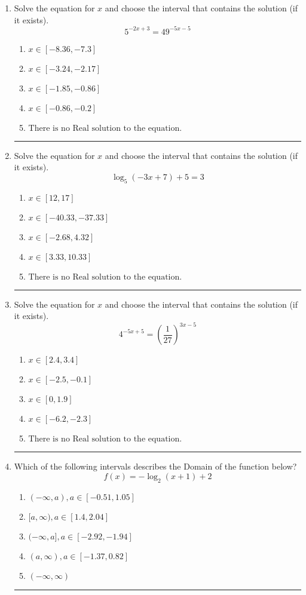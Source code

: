 \documentclass[14pt]{extbook}
\newcommand{\litem}[1]{\item#1\hspace*{-1cm}\rule{\textwidth}{0.4pt}}
\begin{document}
\begin{enumerate}
{\begin{enumerate}[label=\Alph*.]
\end{enumerate} }
\litem{
Solve the equation for $x$ and choose the interval that contains the solution (if it exists).\[ 5^{-2x+3} = 49^{-5x-5} \]\begin{enumerate}[label=\Alph*.]
\item \( x \in [-8.36, -7.3] \)
\item \( x \in [-3.24, -2.17] \)
\item \( x \in [-1.85, -0.86] \)
\item \( x \in [-0.86, -0.2] \)
\item \( \text{There is no Real solution to the equation.} \)

\end{enumerate} }
\litem{
Solve the equation for $x$ and choose the interval that contains the solution (if it exists).\[ \log_{5}{(-3x+7)}+5 = 3 \]\begin{enumerate}[label=\Alph*.]
\item \( x \in [12, 17] \)
\item \( x \in [-40.33, -37.33] \)
\item \( x \in [-2.68, 4.32] \)
\item \( x \in [3.33, 10.33] \)
\item \( \text{There is no Real solution to the equation.} \)

\end{enumerate} }
\litem{
Solve the equation for $x$ and choose the interval that contains the solution (if it exists).\[ 4^{-5x+5} = \left(\frac{1}{27}\right)^{3x-5} \]\begin{enumerate}[label=\Alph*.]
\item \( x \in [2.4, 3.4] \)
\item \( x \in [-2.5, -0.1] \)
\item \( x \in [0, 1.9] \)
\item \( x \in [-6.2, -2.3] \)
\item \( \text{There is no Real solution to the equation.} \)

\end{enumerate} }
\litem{
Which of the following intervals describes the Domain of the function below?\[ f(x) = -\log_2{(x+1)}+2 \]\begin{enumerate}[label=\Alph*.]
\item \( (-\infty, a), a \in [-0.51, 1.05] \)
\item \( [a, \infty), a \in [1.4, 2.04] \)
\item \( (-\infty, a], a \in [-2.92, -1.94] \)
\item \( (a, \infty), a \in [-1.37, 0.82] \)
\item \( (-\infty, \infty) \)


\end{enumerate}}
\end{enumerate}
\end{document}
